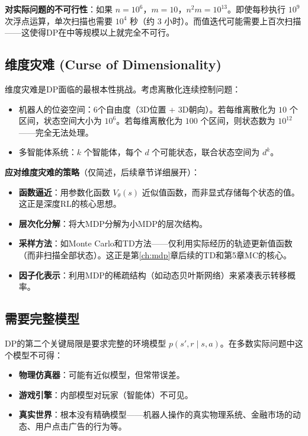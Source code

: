 \textbf{对实际问题的不可行性}：如果 $n = 10^6$，$m = 10$，$n^2 m = 10^{13}$。即使每秒执行 $10^9$ 次浮点运算，单次扫描也需要 $10^4$ 秒（约 $3$ 小时）。而值迭代可能需要上百次扫描——这使得DP在中等规模以上就完全不可行。

\subsection{维度灾难 (Curse of Dimensionality)}

维度灾难是DP面临的最根本性挑战。考虑离散化连续控制问题：
\begin{itemize}
    \item 机器人的位姿空间：6个自由度（3D位置 + 3D朝向）。若每维离散化为 $10$ 个区间，状态空间大小为 $10^6$。若每维离散化为 $100$ 个区间，则状态数为 $10^{12}$——完全无法处理。
    \item 多智能体系统：$k$ 个智能体，每个 $d$ 个可能状态，联合状态空间为 $d^k$。
\end{itemize}

\textbf{应对维度灾难的策略}（仅简述，后续章节详细展开）：
\begin{itemize}
    \item \textbf{函数逼近}：用参数化函数 $V_\theta(s)$ 近似值函数，而非显式存储每个状态的值。这正是深度RL的核心思想。
    \item \textbf{层次化分解}：将大MDP分解为小MDP的层次结构。
    \item \textbf{采样方法}：如Monte Carlo和TD方法——仅利用实际经历的轨迹更新值函数（而非扫描全部状态）。这正是第\ref{ch:mdp}章后续的TD和第5章MC的核心。
    \item \textbf{因子化表示}：利用MDP的稀疏结构（如动态贝叶斯网络）来紧凑表示转移概率。
\end{itemize}

\subsection{需要完整模型}

DP的第二个关键局限是要求完整的环境模型 $p(s', r \mid s, a)$。在多数实际问题中这个模型不可得：
\begin{itemize}
    \item \textbf{物理仿真器}：可能有近似模型，但常带误差。
    \item \textbf{游戏引擎}：内部模型对玩家（智能体）不可见。
    \item \textbf{真实世界}：根本没有精确模型——机器人操作的真实物理系统、金融市场的动态、用户点击广告的行为等。
\end{itemize}

